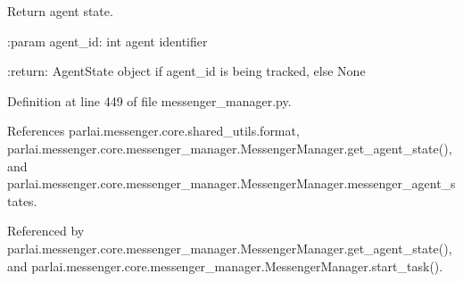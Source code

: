 \begin{DoxyVerb}Return agent state.

:param agent_id:
    int agent identifier

:return:
    AgentState object if agent_id is being tracked, else None
\end{DoxyVerb}
 

Definition at line 449 of file messenger\+\_\+manager.\+py.



References parlai.\+messenger.\+core.\+shared\+\_\+utils.\+format, parlai.\+messenger.\+core.\+messenger\+\_\+manager.\+Messenger\+Manager.\+get\+\_\+agent\+\_\+state(), and parlai.\+messenger.\+core.\+messenger\+\_\+manager.\+Messenger\+Manager.\+messenger\+\_\+agent\+\_\+states.



Referenced by parlai.\+messenger.\+core.\+messenger\+\_\+manager.\+Messenger\+Manager.\+get\+\_\+agent\+\_\+state(), and parlai.\+messenger.\+core.\+messenger\+\_\+manager.\+Messenger\+Manager.\+start\+\_\+task().

